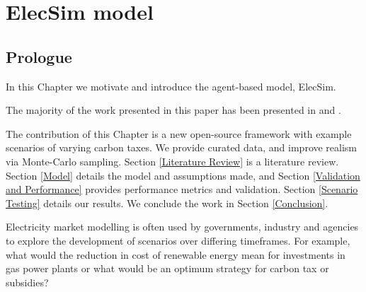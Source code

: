 \chapter{ElecSim model}
\label{chapter:elecsim}

\ifpdf
    \graphicspath{{Chapter3/Figs/Raster/}{Chapter3/Figs/PDF/}{Chapter3/Figs/}}
\else
    \graphicspath{{Chapter3/Figs/Vector/}{Chapter3/Figs/}}
\fi

\section*{Prologue}

In this Chapter we motivate and introduce the agent-based model, ElecSim. 

The majority of the work presented in this paper has been presented in \cite{Kell} and \cite{Kell2020}.


The contribution of this Chapter is a new open-source framework with example scenarios of varying carbon taxes. We provide curated data, and improve realism via Monte-Carlo sampling. Section \ref{Literature Review} is a literature review. Section \ref{Model} details the model and assumptions made, and Section \ref{Validation and Performance} provides performance metrics and validation. Section \ref{Scenario Testing} details our results. We conclude the work in Section \ref{Conclusion}.






	
	Electricity market modelling is often used by governments, industry and agencies to explore the development of scenarios over differing timeframes. For example, what would the reduction in cost of renewable energy mean for investments in gas power plants or what would be an optimum strategy for carbon tax or subsidies? %
	
